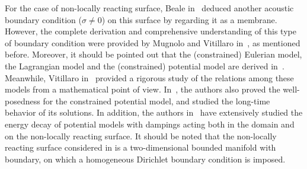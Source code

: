 \documentclass[10pt]{elsarticle}
\begin{document}
For the case of non-locally reacting surface, Beale in~\cite[Section 6]{B1}  deduced another acoustic boundary condition ($\sigma \neq 0$) on this surface by regarding it as a membrane. However, the complete derivation and comprehensive understanding of this type of boundary condition were provided by Mugnolo and Vitillaro in~\cite[Chapter 7]{mugnolo2024wave}, as mentioned before. Moreover, it should be pointed out that the (constrained) Eulerian model, the Lagrangian model and the (constrained) potential model are derived in~\cite{mugnolo2024wave}. Meanwhile, Vitillaro in~\cite{vitillaro2024three} provided a rigorous study of the relations among these models from a mathematical point of view. In~\cite{mugnolo2024wave}, the authors also proved the well-posedness for the constrained potential model, and studied the long-time behavior of its solutions. In addition, the authors in~\cite{barbieri2022damped, vicente2016uniform,ha2016general,HA2018201,frota2014mixed} have extensively studied the energy decay of potential models with dampings acting both in the domain and on the non-locally reacting surface. It should be noted that the non-locally reacting surface considered in \cite{frota2014mixed} is a two-dimensional bounded manifold with boundary, on which a homogeneous Dirichlet boundary condition is imposed. 
\end{document}
